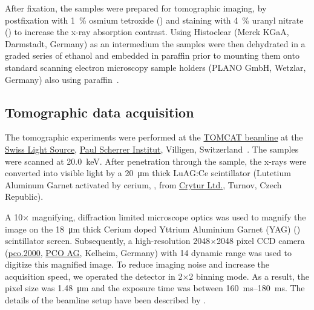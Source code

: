 \documentclass[%
	draft=true,
	paper=a4,%
	twoside=true,%
	abstract=true]{scrartcl}
\begin{document}
After fixation, the samples were prepared for tomographic imaging, by postfixation with \SI{1}{\percent} osmium tetroxide () and staining with \SI{4}{\percent} uranyl nitrate () to increase the x-ray absorption contrast. Using Histoclear (Merck KGaA, Darmstadt, Germany) as an intermedium the samples were then dehydrated in a graded series of ethanol and embedded in paraffin prior to mounting them onto standard scanning electron microscopy sample holders (PLANO GmbH, Wetzlar, Germany) also using paraffin~\cite{Tsuda2008}.

\subsection{Tomographic data acquisition}\label{sec:tomcat}
The tomographic experiments were performed at the \href{http://www.psi.ch/sls/tomcat/}{TOMCAT beamline} at the \href{http://www.psi.ch/sls/}{Swiss Light Source}, \href{http://www.psi.ch/}{Paul Scherrer Institut}, Villigen, Switzerland~\cite{Stampanoni2006a}. The samples were scanned at \SI{20.0}{\kilo\electronvolt}. After penetration through the sample, the x-rays were converted into visible light by a \SI{20}{\micro\meter} thick LuAG:Ce scintillator (Lutetium Aluminum Garnet activated by cerium, , from \href{http://www.crytur.cz/}{Crytur Ltd.}, Turnov, Czech Republic).

A 10\(\times\) magnifying, diffraction limited microscope optics was used to magnify the image on the \SI{18}{\micro\meter} thick Cerium doped Yttrium Aluminium Garnet (YAG) () scintillator screen. Subsequently, a high-resolution 2048\(\times\)2048 pixel CCD camera (\href{http://www.pco.de/sensitive-cameras/pco2000/}{pco.2000}, \href{http://www.pco.de/}{PCO AG}, Kelheim, Germany) with \SI{14}{\bit} dynamic range was used to digitize this magnified image. To reduce imaging noise and increase the acquisition speed, we operated the detector in 2\(\times\)2 binning mode. As a result, the pixel size was \SI{1.48}{\micro\meter} and the exposure time was between \SIrange{160}{180}{\milli\second}. The details of the beamline setup have been described by \citet{Stampanoni2006a}.
\end{document}
